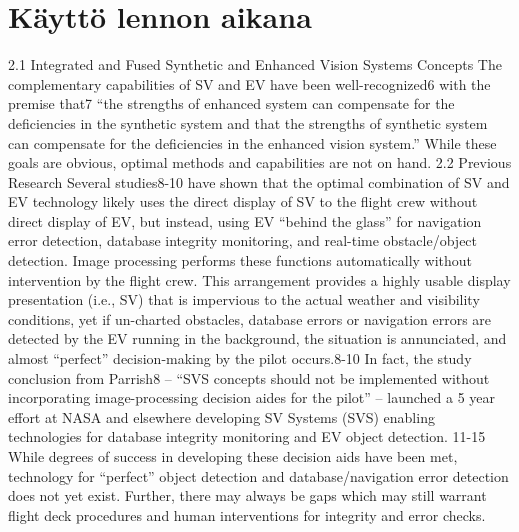 \documentclass[utf8,bachelor,manualbib]{gradu3}
\begin{document}
\section{Käyttö lennon aikana}

2.1 Integrated and Fused Synthetic and Enhanced Vision Systems Concepts
The complementary capabilities of SV and EV have been well-recognized6 with the premise that7 “the
strengths of enhanced system can compensate for the deficiencies in the synthetic system and that the
strengths of synthetic system can compensate for the deficiencies in the enhanced vision system.” While
these goals are obvious, optimal methods and capabilities are not on hand.
2.2 Previous Research
Several studies8-10 have shown that the optimal combination of SV and EV technology likely uses the direct
display of SV to the flight crew without direct display of EV, but instead, using EV “behind the glass” for
navigation error detection, database integrity monitoring, and real-time obstacle/object detection. Image
processing performs these functions automatically without intervention by the flight crew. This arrangement
provides a highly usable display presentation (i.e., SV) that is impervious to the actual weather and visibility
conditions, yet if un-charted obstacles, database errors or navigation errors are detected by the EV running in
the background, the situation is annunciated, and almost “perfect” decision-making by the pilot occurs.8-10 In
fact, the study conclusion from Parrish8 – “SVS concepts should not be implemented without incorporating
image-processing decision aides for the pilot” – launched a 5 year effort at NASA and elsewhere developing
SV Systems (SVS) enabling technologies for database integrity monitoring and EV object detection. 11-15
While degrees of success in developing these decision aids have been met, technology for “perfect” object
detection and database/navigation error detection does not yet exist. Further, there may always be gaps which
may still warrant flight deck procedures and human interventions for integrity and error checks.
\citep{baileyym2007}
\end{document}
